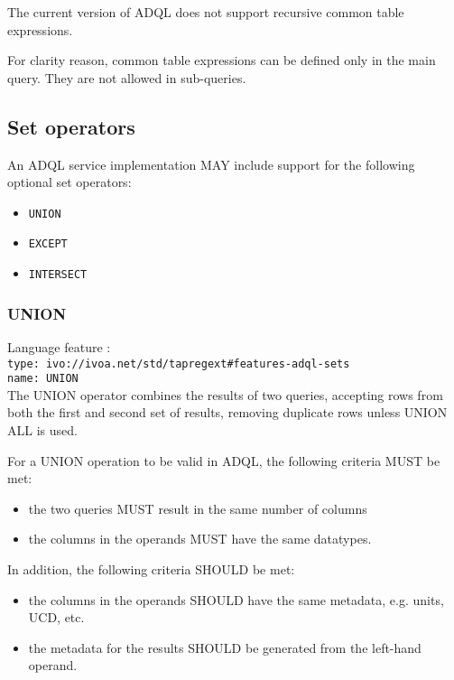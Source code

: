 \documentclass[11pt,a4paper]{ivoa}
\begin{document}
The current version of ADQL does not support recursive common table expressions.

For clarity reason, common table expressions can be defined only in the main
query. They are not allowed in sub-queries.

\subsection{Set operators}
\label{sec:set.operators}

An ADQL service implementation MAY include support for the following optional
set operators:

\begin{itemize}
    \item \verb:UNION:
    \item \verb:EXCEPT:
    \item \verb:INTERSECT:
\end{itemize}

\subsubsection{UNION}
{\footnotesize Language feature :}\\
{\footnotesize \verb|type: ivo://ivoa.net/std/tapregext#features-adql-sets|}\\
{\footnotesize \verb|name: UNION|}\\

The UNION operator combines the results of two queries, accepting rows from
both the first and second set of results,
removing duplicate rows unless UNION ALL is used.

For a UNION operation to be valid in ADQL, the following criteria MUST be met:
\begin{itemize}
    \item the two queries MUST result in the same number of columns
    \item the columns in the operands MUST have the same datatypes.
\end{itemize}

In addition, the following criteria SHOULD be met:
\begin{itemize}
    \item the columns in the operands SHOULD have the same metadata, e.g. units, UCD, etc.
    \item the metadata for the results SHOULD be generated from the left-hand operand.
\end{itemize}
\end{document}
